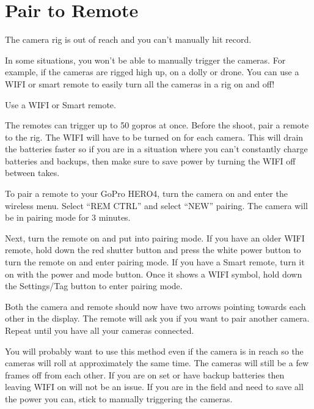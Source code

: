 \chapter{Pair to Remote}
\pagecolor{white}
\label{chap:09}
\begin{fullwidth}

\problem

{\large The camera rig is out of reach and you can’t manually hit record.  \par}

In some situations, you won’t be able to manually trigger the cameras. For example, if the cameras are rigged high up, on a dolly or drone. You can use a WIFI or smart remote to easily turn all the cameras in a rig on and off!  


\solution

{\large Use a WIFI or Smart remote. 
 \par}

The remotes can trigger up to 50 gopros at once. Before the shoot, pair a remote to the rig. The WIFI will have to be turned on for each camera. This will drain the batteries faster so if you are in a situation where you can’t constantly charge batteries and backups, then make sure to save power by turning the WIFI off between takes. 

To pair a remote to your GoPro HERO4, turn the camera on and enter the wireless menu. Select “REM CTRL” and select “NEW” pairing. The camera will be in pairing mode for 3 minutes.


Next, turn the remote on and put into pairing mode. If you have an older WIFI remote, hold down the red shutter button and press the white power button to turn the remote on and enter pairing mode. If you have a Smart remote, turn it on with the power and mode button. Once it shows a WIFI symbol, hold down the Settings/Tag button to enter pairing mode. 


Both the camera and remote should now have two arrows pointing towards each other in the display. The remote will ask you if you want to pair another camera. Repeat until you have all your cameras connected.


You will probably want to use this method even if the camera is in reach so the cameras will roll at approximately the same time. The cameras will still be a few frames off from each other.  If you are on set or have backup batteries then leaving WIFI on will not be an issue. If you are in the field and need to save all the power you can, stick to manually triggering the cameras. 



\clearpage
\end{fullwidth}
